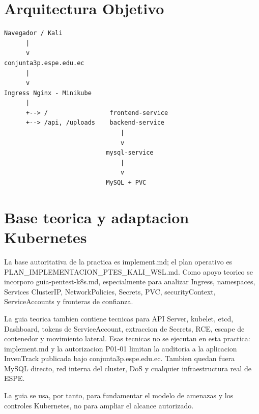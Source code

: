 \section{Arquitectura Objetivo}\label{arquitectura-objetivo}

\begin{tcolorbox}[codebox]
\begin{Verbatim}[fontsize=\scriptsize,breaklines=true,breakanywhere=true]
Navegador / Kali
      |
      v
conjunta3p.espe.edu.ec
      |
      v
Ingress Nginx - Minikube
      |
      +--> /                 frontend-service
      +--> /api, /uploads    backend-service
                                |
                                v
                            mysql-service
                                |
                                v
                            MySQL + PVC
\end{Verbatim}
\end{tcolorbox}

\section{Base teorica y adaptacion Kubernetes}\label{base-teorica-y-adaptacion-kubernetes}

La base autoritativa de la practica es implement.md; el plan operativo es PLAN\_IMPLEMENTACION\_PTES\_KALI\_WSL.md. Como apoyo teorico se incorporo guia-pentest-k8s.md, especialmente para analizar Ingress, namespaces, Services ClusterIP, NetworkPolicies, Secrets, PVC, securityContext, ServiceAccounts y fronteras de confianza.

La guia teorica tambien contiene tecnicas para API Server, kubelet, etcd, Dashboard, tokens de ServiceAccount, extraccion de Secrets, RCE, escape de contenedor y movimiento lateral. Esas tecnicas no se ejecutan en esta practica: implement.md y la autorizacion P01-01 limitan la auditoria a la aplicacion InvenTrack publicada bajo conjunta3p.espe.edu.ec. Tambien quedan fuera MySQL directo, red interna del cluster, DoS y cualquier infraestructura real de ESPE.

La guia se usa, por tanto, para fundamentar el modelo de amenazas y los controles Kubernetes, no para ampliar el alcance autorizado.
